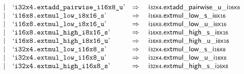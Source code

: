 $$\begin{array}[t]{@{}lrrl@{}l@{}l@{}l@{}}
& & | & \mbox{‘\texttt{i32x4.extadd\_pairwise\_i16x8\_u}’} & \quad\Rightarrow\quad{} & {\mathsf{i{\scriptstyle 32}}}{\mathsf{x}}{\mathsf{{\scriptstyle 4}}} {.} {{\mathsf{extadd\_pairwise}}{\mathsf{\_}}{\mathsf{u}}}{\mathsf{\_}}{{\mathsf{i{\scriptstyle 16}}}{\mathsf{x}}{\mathsf{{\scriptstyle 8}}}} \\
& & | & \mbox{‘\texttt{i16x8.extmul\_low\_i8x16\_s}’} & \quad\Rightarrow\quad{} & {\mathsf{i{\scriptstyle 16}}}{\mathsf{x}}{\mathsf{{\scriptstyle 8}}} {.} {{\mathsf{extmul}}{\mathsf{\_}}{\mathsf{low}}{\mathsf{\_}}{\mathsf{s}}}{\mathsf{\_}}{{\mathsf{i{\scriptstyle 8}}}{\mathsf{x}}{\mathsf{{\scriptstyle 16}}}} \\
& & | & \mbox{‘\texttt{i16x8.extmul\_low\_i8x16\_u}’} & \quad\Rightarrow\quad{} & {\mathsf{i{\scriptstyle 16}}}{\mathsf{x}}{\mathsf{{\scriptstyle 8}}} {.} {{\mathsf{extmul}}{\mathsf{\_}}{\mathsf{low}}{\mathsf{\_}}{\mathsf{u}}}{\mathsf{\_}}{{\mathsf{i{\scriptstyle 8}}}{\mathsf{x}}{\mathsf{{\scriptstyle 16}}}} \\
& & | & \mbox{‘\texttt{i16x8.extmul\_high\_i8x16\_s}’} & \quad\Rightarrow\quad{} & {\mathsf{i{\scriptstyle 16}}}{\mathsf{x}}{\mathsf{{\scriptstyle 8}}} {.} {{\mathsf{extmul}}{\mathsf{\_}}{\mathsf{high}}{\mathsf{\_}}{\mathsf{s}}}{\mathsf{\_}}{{\mathsf{i{\scriptstyle 8}}}{\mathsf{x}}{\mathsf{{\scriptstyle 16}}}} \\
& & | & \mbox{‘\texttt{i16x8.extmul\_high\_i8x16\_u}’} & \quad\Rightarrow\quad{} & {\mathsf{i{\scriptstyle 16}}}{\mathsf{x}}{\mathsf{{\scriptstyle 8}}} {.} {{\mathsf{extmul}}{\mathsf{\_}}{\mathsf{high}}{\mathsf{\_}}{\mathsf{u}}}{\mathsf{\_}}{{\mathsf{i{\scriptstyle 8}}}{\mathsf{x}}{\mathsf{{\scriptstyle 16}}}} \\
& & | & \mbox{‘\texttt{i32x4.extmul\_low\_i16x8\_s}’} & \quad\Rightarrow\quad{} & {\mathsf{i{\scriptstyle 32}}}{\mathsf{x}}{\mathsf{{\scriptstyle 4}}} {.} {{\mathsf{extmul}}{\mathsf{\_}}{\mathsf{low}}{\mathsf{\_}}{\mathsf{s}}}{\mathsf{\_}}{{\mathsf{i{\scriptstyle 16}}}{\mathsf{x}}{\mathsf{{\scriptstyle 8}}}} \\
& & | & \mbox{‘\texttt{i32x4.extmul\_low\_i16x8\_u}’} & \quad\Rightarrow\quad{} & {\mathsf{i{\scriptstyle 32}}}{\mathsf{x}}{\mathsf{{\scriptstyle 4}}} {.} {{\mathsf{extmul}}{\mathsf{\_}}{\mathsf{low}}{\mathsf{\_}}{\mathsf{u}}}{\mathsf{\_}}{{\mathsf{i{\scriptstyle 16}}}{\mathsf{x}}{\mathsf{{\scriptstyle 8}}}} \\
& & | & \mbox{‘\texttt{i32x4.extmul\_high\_i16x8\_s}’} & \quad\Rightarrow\quad{} & {\mathsf{i{\scriptstyle 32}}}{\mathsf{x}}{\mathsf{{\scriptstyle 4}}} {.} {{\mathsf{extmul}}{\mathsf{\_}}{\mathsf{high}}{\mathsf{\_}}{\mathsf{s}}}{\mathsf{\_}}{{\mathsf{i{\scriptstyle 16}}}{\mathsf{x}}{\mathsf{{\scriptstyle 8}}}} \\

\end{array}$$
